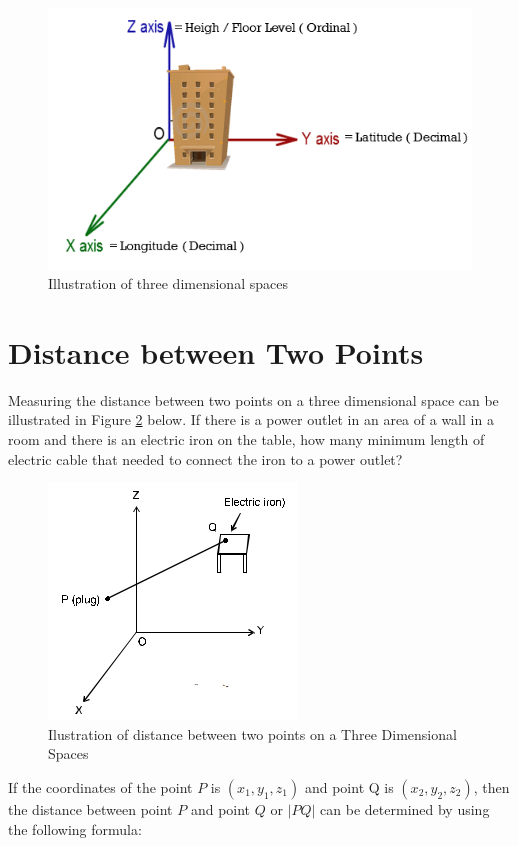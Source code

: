 \begin{figure}[h!]
	\centering
	\includegraphics[scale=0.5]{figure10.png}
	\caption{Illustration of three dimensional spaces}
	\label{fig:figure10}
\end{figure}

\section{Distance between Two Points}
Measuring the distance between two points on a three dimensional space can be illustrated in Figure \ref{fig:figure11} below. If there is a power outlet in an area of a wall in a room and there is an electric iron on the table, how many minimum length of electric cable that needed to connect the iron to a power outlet? 

\begin{figure}[h!]
	\centering
	\includegraphics[scale=1]{figure11.png}
	\caption{Ilustration of distance between two points on a Three Dimensional Spaces}
	\label{fig:figure11}
\end{figure}

If the coordinates of the point $P$ is $(x_1, y_1, z_1)$ and point Q is $(x_2, y_2, z_2)$, then the distance between point $P$ and point $Q$ or $|PQ|$ can be determined by using the following formula:


